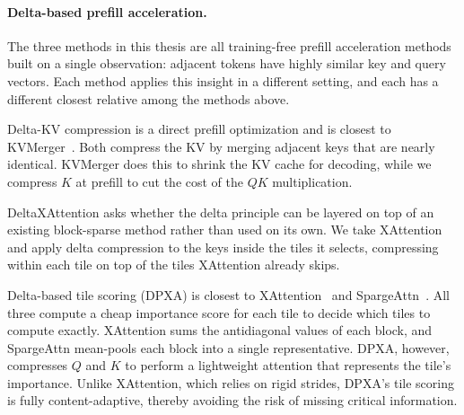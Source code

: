 \paragraph{Delta-based prefill acceleration.}
The three methods in this thesis are all training-free prefill acceleration methods built on a single observation: adjacent tokens have highly similar key and query vectors.
Each method applies this insight in a different setting, and each has a different closest relative among the methods above.

Delta-KV compression is a direct prefill optimization and is closest to KVMerger~\citep{wang2024kvmerger}.
Both compress the KV by merging adjacent keys that are nearly identical.
KVMerger does this to shrink the KV cache for decoding, while we compress $K$ at prefill to cut the cost of the $QK$ multiplication.

DeltaXAttention asks whether the delta principle can be layered on top of an existing block-sparse method rather than used on its own.
We take XAttention~\citep{xu2025xattention} and apply delta compression to the keys inside the tiles it selects, compressing within each tile on top of the tiles XAttention already skips.

Delta-based tile scoring (DPXA) is closest to XAttention~\citep{xu2025xattention} and SpargeAttn~\citep{zhang2025spargeattn}.
All three compute a cheap importance score for each tile to decide which tiles to compute exactly.
XAttention sums the antidiagonal values of each block, and SpargeAttn mean-pools each block into a single representative. DPXA, however, compresses $Q$ and $K$ to perform a lightweight attention that represents the tile's importance. Unlike XAttention, which relies on rigid strides, DPXA's tile scoring is fully content-adaptive, thereby avoiding the risk of missing critical information.
